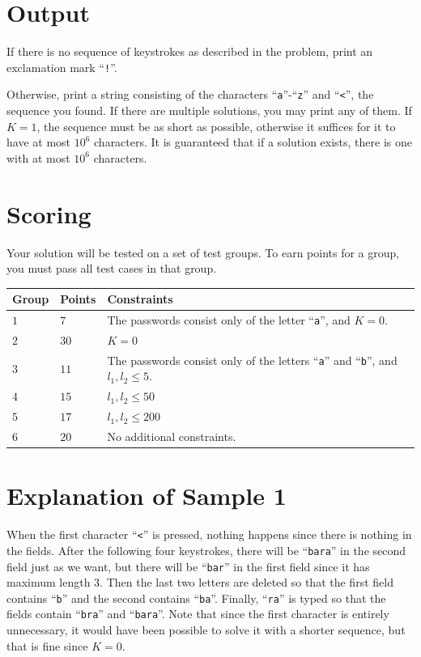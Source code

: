 \section*{Output}
If there is no sequence of keystrokes as described in the problem, print an exclamation mark ``\texttt{!}''.

Otherwise, print a string consisting of the characters ``\texttt{a}''-``\texttt{z}'' and ``\texttt{<}'', the sequence you found. If there
are multiple solutions, you may print any of them. If $K = 1$, the sequence must be as short as possible,
otherwise it suffices for it to have at most $10^6$ characters. It is guaranteed that if a solution exists,
there is one with at most $10^6$ characters.

\section*{Scoring}
Your solution will be tested on a set of test groups.
To earn points for a group, you must pass all test cases in that group.

\noindent
\begin{tabular}{| l | l | l |}
\hline
\textbf{Group} & \textbf{Points} & \textbf{Constraints} \\ \hline
$1$   & $7$        & The passwords consist only of the letter ``\texttt{a}'', and $K = 0$. \\ \hline
$2$   & $30$       & $K = 0$ \\ \hline
$3$   & $11$       & The passwords consist only of the letters ``\texttt{a}'' and ``\texttt{b}'', and $l_1, l_2 \leq 5$. \\ \hline
$4$   & $15$       & $l_1, l_2 \leq 50$ \\ \hline
$5$   & $17$       & $l_1, l_2 \leq 200$ \\ \hline
$6$   & $20$       & No additional constraints. \\ \hline
\end{tabular}

\section*{Explanation of Sample 1}
When the first character ``\texttt{<}'' is pressed, nothing happens since there is nothing in the fields. After the following
four keystrokes, there will be ``\texttt{bara}'' in the second field just as we want, but there will be ``\texttt{bar}''
in the first field since it has maximum length $3$. Then the last two letters are deleted so that the first
field contains ``\texttt{b}'' and the second contains ``\texttt{ba}''. Finally, ``\texttt{ra}'' is typed so that the fields contain ``\texttt{bra}'' and ``\texttt{bara}''. Note
that since the first character is entirely unnecessary, it would have been possible to solve it with a shorter sequence, but that is fine
since $K = 0$.
